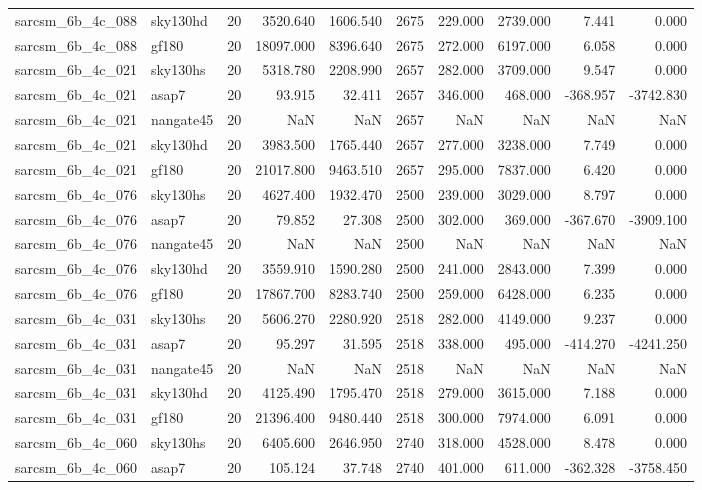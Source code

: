 \documentclass{article}
\begin{document}
\begin{longtable}{llrrrrrrrr}
sarcsm\_6b\_4c\_088 & sky130hd & 20 & 3520.640 & 1606.540 & 2675 & 229.000 & 2739.000 & 7.441 & 0.000 \\
sarcsm\_6b\_4c\_088 & gf180 & 20 & 18097.000 & 8396.640 & 2675 & 272.000 & 6197.000 & 6.058 & 0.000 \\
sarcsm\_6b\_4c\_021 & sky130hs & 20 & 5318.780 & 2208.990 & 2657 & 282.000 & 3709.000 & 9.547 & 0.000 \\
sarcsm\_6b\_4c\_021 & asap7 & 20 & 93.915 & 32.411 & 2657 & 346.000 & 468.000 & -368.957 & -3742.830 \\
sarcsm\_6b\_4c\_021 & nangate45 & 20 & NaN & NaN & 2657 & NaN & NaN & NaN & NaN \\
sarcsm\_6b\_4c\_021 & sky130hd & 20 & 3983.500 & 1765.440 & 2657 & 277.000 & 3238.000 & 7.749 & 0.000 \\
sarcsm\_6b\_4c\_021 & gf180 & 20 & 21017.800 & 9463.510 & 2657 & 295.000 & 7837.000 & 6.420 & 0.000 \\
sarcsm\_6b\_4c\_076 & sky130hs & 20 & 4627.400 & 1932.470 & 2500 & 239.000 & 3029.000 & 8.797 & 0.000 \\
sarcsm\_6b\_4c\_076 & asap7 & 20 & 79.852 & 27.308 & 2500 & 302.000 & 369.000 & -367.670 & -3909.100 \\
sarcsm\_6b\_4c\_076 & nangate45 & 20 & NaN & NaN & 2500 & NaN & NaN & NaN & NaN \\
sarcsm\_6b\_4c\_076 & sky130hd & 20 & 3559.910 & 1590.280 & 2500 & 241.000 & 2843.000 & 7.399 & 0.000 \\
sarcsm\_6b\_4c\_076 & gf180 & 20 & 17867.700 & 8283.740 & 2500 & 259.000 & 6428.000 & 6.235 & 0.000 \\
sarcsm\_6b\_4c\_031 & sky130hs & 20 & 5606.270 & 2280.920 & 2518 & 282.000 & 4149.000 & 9.237 & 0.000 \\
sarcsm\_6b\_4c\_031 & asap7 & 20 & 95.297 & 31.595 & 2518 & 338.000 & 495.000 & -414.270 & -4241.250 \\
sarcsm\_6b\_4c\_031 & nangate45 & 20 & NaN & NaN & 2518 & NaN & NaN & NaN & NaN \\
sarcsm\_6b\_4c\_031 & sky130hd & 20 & 4125.490 & 1795.470 & 2518 & 279.000 & 3615.000 & 7.188 & 0.000 \\
sarcsm\_6b\_4c\_031 & gf180 & 20 & 21396.400 & 9480.440 & 2518 & 300.000 & 7974.000 & 6.091 & 0.000 \\
sarcsm\_6b\_4c\_060 & sky130hs & 20 & 6405.600 & 2646.950 & 2740 & 318.000 & 4528.000 & 8.478 & 0.000 \\
sarcsm\_6b\_4c\_060 & asap7 & 20 & 105.124 & 37.748 & 2740 & 401.000 & 611.000 & -362.328 & -3758.450 \\

\end{longtable}
\end{document}
